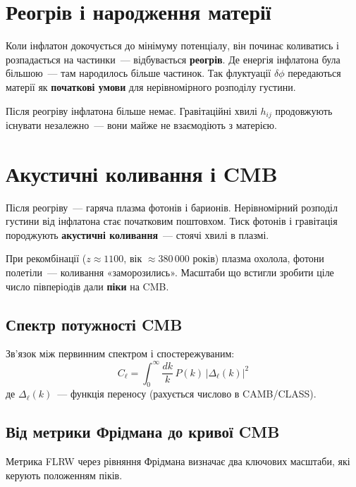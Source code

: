 \documentclass[12pt, a4paper]{article}
\begin{document}
\section{Реогрів і народження матерії}

Коли інфлатон докочується до мінімуму потенціалу, він починає коливатись
і розпадається на частинки~--- відбувається \textbf{реогрів}.
Де енергія інфлатона була більшою~--- там народилось більше частинок.
Так флуктуації $\delta\phi$ передаються матерії як \textbf{початкові умови}
для нерівномірного розподілу густини.

\begin{keybox}
Після реогріву інфлатона більше немає.
Гравітаційні хвилі $h_{ij}$ продовжують існувати незалежно~---
вони майже не взаємодіють з матерією.
\end{keybox}

\section{Акустичні коливання і CMB}

Після реогріву~--- гаряча плазма фотонів і барионів.
Нерівномірний розподіл густини від інфлатона стає початковим поштовхом.
Тиск фотонів і гравітація породжують \textbf{акустичні коливання}~---
стоячі хвилі в плазмі.

При рекомбінації ($z \approx 1100$, вік $\approx 380\,000$ років)
плазма охолола, фотони полетіли~--- коливання «заморозились».
Масштаби що встигли зробити ціле число півперіодів дали \textbf{піки} на CMB.

\subsection{Спектр потужності CMB}

Зв'язок між первинним спектром і спостережуваним:
\[
  C_\ell = \int_0^\infty \frac{dk}{k}\, P(k)\,\bigl|\Delta_\ell(k)\bigr|^2
\]
де $\Delta_\ell(k)$~--- функція переносу (рахується числово в CAMB/CLASS).

\subsection{Від метрики Фрідмана до кривої CMB}

Метрика FLRW через рівняння Фрідмана визначає два ключових масштаби,
які керують положенням піків.
\end{document}
